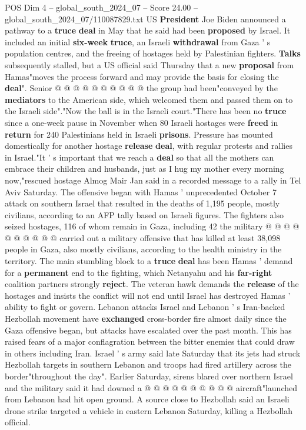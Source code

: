 \begin{textsample}{POS Dim 4 – global\_south\_2024\_07 – Score 24.00 – global\_south\_2024\_07/110087829.txt}
US \textbf{President} Joe Biden announced a pathway to a \textbf{truce} \textbf{deal} in May that he said had been \textbf{proposed} by Israel.
It included an initial \textbf{six-week} \textbf{truce}, an Israeli \textbf{withdrawal} from Gaza ' s population centres, and the freeing of hostages held by Palestinian fighters. \textbf{Talks} subsequently stalled, but a US official said Thursday that a new \textbf{proposal} from Hamas"moves the process forward and may provide the basis for closing the \textbf{deal}".
Senior @ @ @ @ @ @ @ @ @ @ the group had been"conveyed by the \textbf{mediators} to the American side, which welcomed them and passed them on to the Israeli side"."Now the ball is in the Israeli court."There has been no \textbf{truce} since a one-week pause in November when 80 Israeli hostages were \textbf{freed} in \textbf{return} for 240 Palestinians held in Israeli \textbf{prisons}.
Pressure has mounted domestically for another hostage \textbf{release} \textbf{deal}, with regular protests and rallies in Israel."It ' s important that we reach a \textbf{deal} so that all the mothers can embrace their children and husbands, just as I hug my mother every morning now,"rescued hostage Almog Mair Jan said in a recorded message to a rally in Tel Aviv Saturday.
The offensive began with Hamas ' unprecedented October 7 attack on southern Israel that resulted in the deaths of 1,195 people, mostly civilians, according to an AFP tally based on Israeli figures.
The fighters also seized hostages, 116 of whom remain in Gaza, including 42 the military @ @ @ @ @ @ @ @ @ @ carried out a military offensive that has killed at least 38,098 people in Gaza, also mostly civilians, according to the health ministry in the territory.
The main stumbling block to a \textbf{truce} \textbf{deal} has been Hamas ' demand for a \textbf{permanent} end to the fighting, which Netanyahu and his \textbf{far-right} coalition partners strongly \textbf{reject}.
The veteran hawk demands the \textbf{release} of the hostages and insists the conflict will not end until Israel has destroyed Hamas ' ability to fight or govern.
Lebanon attacks Israel and Lebanon ' s Iran-backed Hezbollah movement have \textbf{exchanged} cross-border fire almost daily since the Gaza offensive began, but attacks have escalated over the past month.
This has raised fears of a major conflagration between the bitter enemies that could draw in others including Iran.
Israel ' s army said late Saturday that its jets had struck Hezbollah targets in southern Lebanon and troops had fired artillery across the border"throughout the day".
Earlier Saturday, sirens blared over northern Israel and the military said it had downed a @ @ @ @ @ @ @ @ @ @ aircraft"launched from Lebanon had hit open ground.
A source close to Hezbollah said an Israeli drone strike targeted a vehicle in eastern Lebanon Saturday, killing a Hezbollah official.

\end{textsample}
